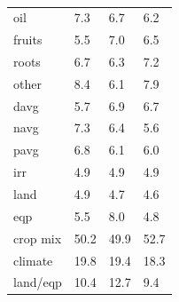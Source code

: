 \documentclass[12pt]{article}
\begin{document}
\begin{table}[h!]
{\begin{tabular}{llll}
oil & 7.3 & 6.7 & 6.2 \\
fruits & 5.5 & 7.0 & 6.5 \\
roots & 6.7 & 6.3 & 7.2 \\
other & 8.4 & 6.1 & 7.9 \\
davg & 5.7 & 6.9 & 6.7 \\
navg & 7.3 & 6.4 & 5.6 \\
pavg & 6.8 & 6.1 & 6.0 \\
irr & 4.9 & 4.9 & 4.9 \\
land & 4.9 & 4.7 & 4.6 \\
eqp & 5.5 & 8.0 & 4.8 \\
\midrule
crop mix & 50.2 & 49.9 & 52.7 \\
climate & 19.8 & 19.4 & 18.3 \\
land/eqp & 10.4 & 12.7 & 9.4 \\
\bottomrule
\end{tabular}
\caption{ }
\label{t.ny.trop_percentages}
}
\end{table}
\end{document}
